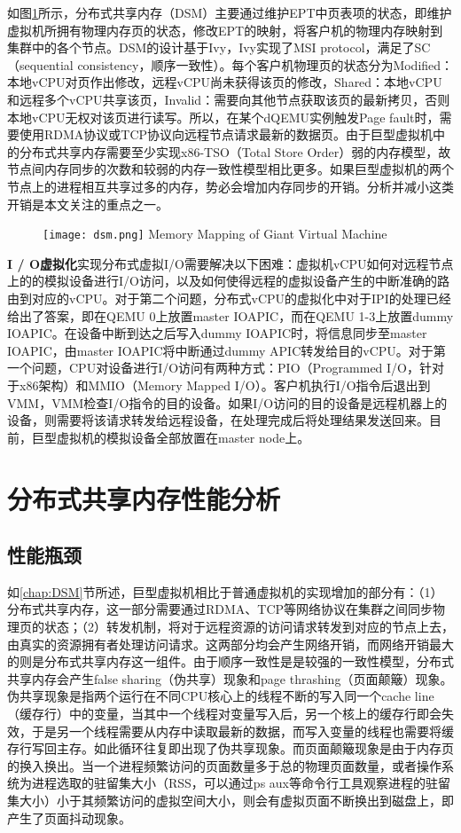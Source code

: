 如图\ref{fig:DSM}所示，分布式共享内存（DSM）主要通过维护EPT中页表项的状态，即维护虚拟机所拥有物理内存页的状态，修改EPT的映射，将客户机的物理内存映射到集群中的各个节点。DSM的设计基于Ivy\cite{ivy}，Ivy实现了MSI protocol，满足了SC（sequential consistency，顺序一致性）。每个客户机物理页的状态分为Modified：本地vCPU对页作出修改，远程vCPU尚未获得该页的修改，Shared：本地vCPU和远程多个vCPU共享该页，Invalid：需要向其他节点获取该页的最新拷贝，否则本地vCPU无权对该页进行读写。所以，在某个dQEMU实例触发Page fault时，需要使用RDMA协议或TCP协议向远程节点请求最新的数据页。由于巨型虚拟机中的分布式共享内存需要至少实现x86-TSO（Total Store Order）\cite{tso}弱的内存模型，故节点间内存同步的次数和较弱的内存一致性模型相比更多。如果巨型虚拟机的两个节点上的进程相互共享过多的内存，势必会增加内存同步的开销。分析并减小这类开销是本文关注的重点之一。
\label{chap:DSM}
\begin{figure}[!htp]
  \centering
  \texttt{[image: dsm.png]}
    {Memory Mapping of Giant Virtual Machine}
  \label{fig:DSM}
\end{figure}

\noindent\textbf{I / O虚拟化}\quad 实现分布式虚拟I/O需要解决以下困难：虚拟机vCPU如何对远程节点上的的模拟设备进行I/O访问，以及如何使得远程的虚拟设备产生的中断准确的路由到对应的vCPU。对于第二个问题，分布式vCPU的虚拟化中对于IPI的处理已经给出了答案，即在QEMU 0上放置master IOAPIC，而在QEMU 1-3上放置dummy IOAPIC。在设备中断到达之后写入dummy IOAPIC时，将信息同步至master IOAPIC，由master IOAPIC将中断通过dummy APIC转发给目的vCPU。对于第一个问题，CPU对设备进行I/O访问有两种方式：PIO（Programmed I/O，针对于x86架构）和MMIO（Memory Mapped I/O）。客户机执行I/O指令后退出到VMM，VMM检查I/O指令的目的设备。如果I/O访问的目的设备是远程机器上的设备，则需要将该请求转发给远程设备，在处理完成后将处理结果发送回来。目前，巨型虚拟机的模拟设备全部放置在master node上。

\section{分布式共享内存性能分析}
\subsection{性能瓶颈}
\label{chap:bottle}
如\ref{chap:DSM}节所述，巨型虚拟机相比于普通虚拟机的实现增加的部分有：（1）分布式共享内存，这一部分需要通过RDMA、TCP等网络协议在集群之间同步物理页的状态；（2）转发机制，将对于远程资源的访问请求转发到对应的节点上去，由真实的资源拥有者处理访问请求。这两部分均会产生网络开销，而网络开销最大的则是分布式共享内存这一组件。由于顺序一致性是是较强的一致性模型，分布式共享内存会产生false sharing（伪共享）现象和page thrashing（页面颠簸）现象\cite{sharing}。伪共享现象是指两个运行在不同CPU核心上的线程不断的写入同一个cache line（缓存行）中的变量，当其中一个线程对变量写入后，另一个核上的缓存行即会失效，于是另一个线程需要从内存中读取最新的数据，而写入变量的线程也需要将缓存行写回主存。如此循环往复即出现了伪共享现象。而页面颠簸现象是由于内存页的换入换出。当一个进程频繁访问的页面数量多于总的物理页面数量，或者操作系统为进程选取的驻留集大小（RSS，可以通过ps aux等命令行工具观察进程的驻留集大小）小于其频繁访问的虚拟空间大小，则会有虚拟页面不断换出到磁盘上，即产生了页面抖动现象。

